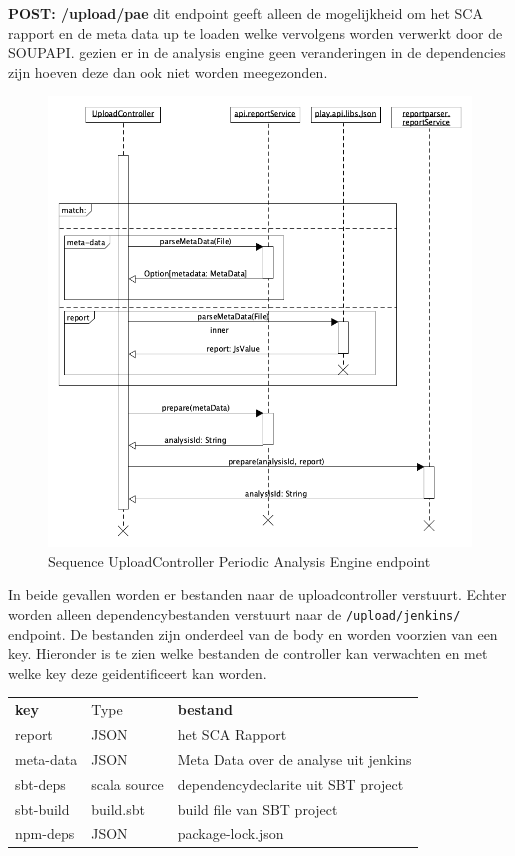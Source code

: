 \textbf{POST: /upload/pae} dit endpoint geeft alleen de mogelijkheid om het SCA rapport en de meta data up te loaden welke vervolgens worden verwerkt door de SOUPAPI. gezien er in de analysis engine geen veranderingen in de dependencies zijn hoeven deze dan ook niet worden meegezonden.

\begin{figure}[bth]
    \myfloatalign
    \includegraphics[width=12cm]{gfx/umlet/exports/SequploadController-pae}
    \caption{Sequence UploadController Periodic Analysis Engine endpoint}
    \label{fig:SequenceUploadReportpaet}
\end{figure}
In beide gevallen worden er bestanden naar de uploadcontroller verstuurt. Echter worden alleen dependencybestanden verstuurt naar de \texttt{/upload/jenkins/} endpoint. De bestanden zijn onderdeel van de body en worden voorzien van een key. Hieronder is te zien welke bestanden de controller kan verwachten en met welke key deze geidentificeert kan worden.

\begin{tabular}{lll}
    \textbf{key} & Type & \textbf{bestand} \\
    report & JSON & het SCA Rapport \\
    meta-data & JSON & Meta Data over de analyse uit jenkins \\
    sbt-deps & scala source & dependencydeclarite uit SBT project \\
    sbt-build & build.sbt  & build file van SBT project\\
    npm-deps & JSON & package-lock.json \\
\end{tabular} \\


